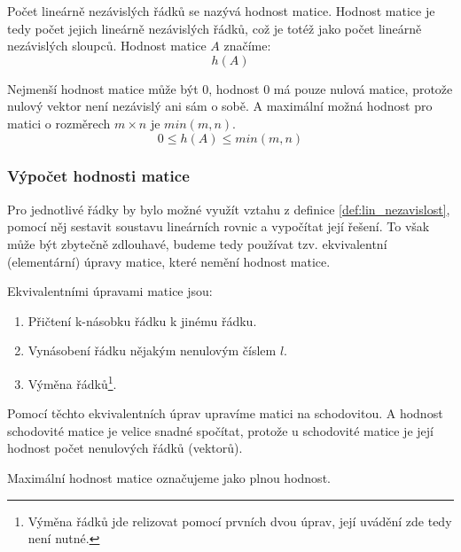 Počet lineárně nezávislých řádků se nazývá hodnost matice. Hodnost matice je tedy počet jejich
lineárně nezávislých řádků, což je totéž jako počet lineárně nezávislých sloupců. Hodnost
matice $A$ značíme:
$$h(A)$$

Nejmenší hodnost matice může být 0, hodnost 0 má pouze nulová matice, protože nulový vektor
není nezávislý ani sám o sobě. A maximální možná hodnost pro matici o rozměrech
$m \times n$ je $min(m, n)$.
$$0 \leq h(A) \leq min(m, n)$$


\subsubsection{Výpočet hodnosti matice}
Pro jednotlivé řádky by bylo možné využít vztahu z definice \ref{def:lin_nezavislost},
pomocí něj sestavit soustavu lineárních rovnic a vypočítat její řešení. To však může být
zbytečně zdlouhavé, budeme tedy používat tzv. ekvivalentní (elementární) úpravy matice,
které nemění hodnost matice.

Ekvivalentními úpravami matice jsou:
\begin{enumerate}
    \label{ekv_upravy}
    \item Přičtení k-násobku řádku k jinému řádku.
    \item Vynásobení řádku nějakým nenulovým číslem $l$.
    \item Výměna řádků\footnote{Výměna řádků jde relizovat pomocí prvních dvou úprav,
    její uvádění zde tedy není nutné.}.
\end{enumerate}

Pomocí těchto ekvivalentních úprav upravíme matici na schodovitou. A hodnost schodovité
matice je velice snadné spočítat, protože u schodovité matice je její hodnost počet nenulových
řádků (vektorů).

Maximální hodnost matice označujeme jako plnou hodnost.

